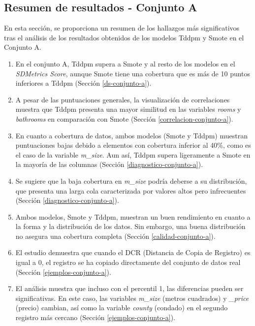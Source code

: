

\newpage
\subsection{Resumen de resultados - Conjunto A}
En esta sección, se proporciona un resumen de los hallazgos más significativos tras el análisis de los resultados obtenidos de los modelos Tddpm y Smote en el Conjunto A.
\begin{enumerate}

    \item En el conjunto A, Tddpm supera a Smote y al resto de los modelos en el \emph{SDMetrics Score}, aunque Smote tiene una cobertura que es más de 10 puntos inferiores a Tddpm (Sección \ref{ds-conjunto-a}).
    
    \item A pesar de las puntuaciones generales, la visualización de correlaciones muestra que Tddpm presenta una mayor similitud en las variables \emph{rooms} y \emph{bathrooms} en comparación con Smote (Sección \ref{correlacion-conjunto-a}).
    
    \item En cuanto a cobertura de datos, ambos modelos (Smote y Tddpm) muestran puntuaciones bajas debido a elementos con cobertura inferior al 40\%, como es el caso de la variable \emph{m\_size}. Aun así, Tddpm supera ligeramente a Smote en la mayoría de las columnas (Sección \ref{diagnostico-conjunto-a}).
    
    \item Se sugiere que la baja cobertura en \emph{m\_size} podría deberse a su distribución, que presenta una larga cola caracterizada por valores altos pero infrecuentes (Sección \ref{diagnostico-conjunto-a}).
    
    \item Ambos modelos, Smote y Tddpm, muestran un buen rendimiento en cuanto a la forma y la distribución de los datos. Sin embargo, una buena distribución no asegura una cobertura completa (Sección \ref{calidad-conjunto-a}).
    
    \item El estudio demuestra que cuando el DCR (Distancia de Copia de Registro) es igual a 0, el registro se ha copiado directamente del conjunto de datos real (Sección \ref{ejemplos-conjunto-a}).
    
    \item El análisis muestra que incluso con el percentil 1, las diferencias pueden ser significativas. En este caso, las variables \emph{m\_size} (metros cuadrados) y \emph{\_price} (precio) cambian, así como la variable \emph{county} (condado) en el segundo registro más cercano (Sección \ref{ejemplos-conjunto-a}).
    

\end{enumerate}
